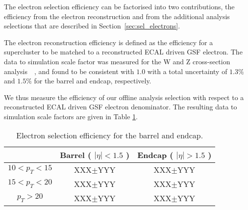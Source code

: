 
The electron selection efficiency can be factorised into two contributions,
the efficiency from the electron reconstruction and from the additional
analysis selections that are described in Section~\ref{sec:sel_electrons}.

The electron reconstruction efficiency is defined as the efficiency for a
supercluster to be matched to a reconstructed ECAL driven GSF electron.
The data to simulation scale factor was measured for the W and Z cross-section
analysis~\cite{VBTFCrossSectionNote}~\cite{ref:tagprobe_mit_w},
and found to be consistent with $1.0$ with a total uncertainty of
$1.3\%$ and $1.5\%$ for the barrel and endcap, respectively.

We thus measure the efficiency of our offline analysis selection 
with respect to a reconstructed ECAL driven GSF electron denominator. 
The resulting data to simulation scale factors are given in Table \ref{tab:eff_ele_offline}.

\begin{table}[!ht]
\begin{center}
\begin{tabular}{c|c|c} 
\hline
              & Barrel ( $|\eta|<1.5$ )  & Endcap ( $|\eta|>1.5$ )  \\ 
\hline
$10<p_{T}<15$ & XXX$\pm$YYY & XXX$\pm$YYY                 \\ \hline
$15<p_{T}<20$ & XXX$\pm$YYY & XXX$\pm$YYY            \\ \hline
$p_T>20$   & XXX$\pm$YYY & XXX$\pm$YYY \\ \hline
\end{tabular}
\caption{Electron selection efficiency for the barrel and endcap.
\label{tab:eff_ele_offline}}
\end{center}
\end{table}
